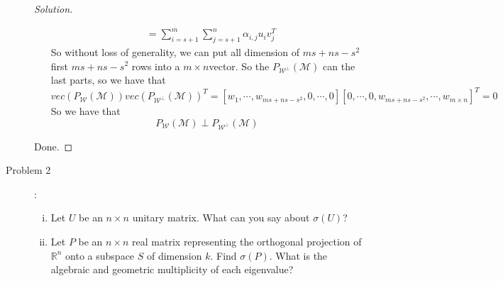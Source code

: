 \documentclass[a4paper]{article}
\newenvironment{solution}
  {\renewcommand\qedsymbol{$\blacksquare$}\begin{proof}[Solution]}
  {\end{proof}}
\begin{document}
\begin{description}
\begin{solution}
\begin{enumerate}[i)]
\begin{align*}
        &=\sum_{i=s+1}^{m}\sum_{j=s+1}^{n}\alpha_{i,j}u_{i}v_{j}^{T}
      \end{align*}
      So without loss of generality, we can put all dimension of $ms+ns-s^{2}$  first $ms+ns-s^{2}$ rows into a $m\times n $vector. So the $P_{\mathcal{W}^{\perp}}(\mathcal{M})$ can the last parts, so we have that
      $$vec(P_{\mathcal{W}}(\mathcal{M}))vec(P_{\mathcal{W}^{\perp}}(\mathcal{M}))^{T}=\left[w_{1},\cdots,w_{ms+ns-s^{2}},0,\cdots,0\right][0,\cdots,0,w_{ms+ns-s^{2}},\cdots,w_{m\times n}]^{T}=0$$
      So we have that $$P_{\mathcal{W}}(\mathcal{M}) \perp P_{\mathcal{W}^{\perp}}(\mathcal{M})$$
    \end{enumerate}
      Done.
  \end{solution}

  \item[Problem 2]:
    \begin{enumerate}[i)]
      \item  Let $U$ be an $n\times n$ unitary matrix. What can you say about $\sigma(U)$?
      \item Let $P$ be an $n\times n$ real matrix representing the orthogonal projection of $\mathbb{R}^{n}$ onto a subspace $S$ of dimension $k$. Find $\sigma(P)$. What is the algebraic and geometric multiplicity of each eigenvalue?
    \end{enumerate}


\end{description}
\end{document}
